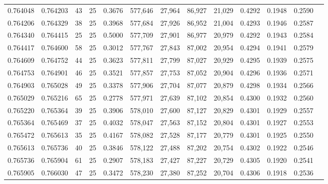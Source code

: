 \begin{tabular}{rrrrrrrrrrrrr}
0.764048 & 0.764203 &    43 &  25 &                                     0.3676 & 577,646 &  27,964 &  86,927 &  21,029 & 0.4292 & 0.1948 & 0.2590 \\
0.764206 & 0.764329 &    38 &  25 &                                     0.3968 & 577,684 &  27,926 &  86,952 &  21,004 & 0.4293 & 0.1946 & 0.2587 \\
0.764340 & 0.764415 &    25 &  25 &                                     0.5000 & 577,709 &  27,901 &  86,977 &  20,979 & 0.4292 & 0.1943 & 0.2584 \\
0.764417 & 0.764600 &    58 &  25 &                                     0.3012 & 577,767 &  27,843 &  87,002 &  20,954 & 0.4294 & 0.1941 & 0.2579 \\
0.764609 & 0.764752 &    44 &  25 &                                     0.3623 & 577,811 &  27,799 &  87,027 &  20,929 & 0.4295 & 0.1939 & 0.2575 \\
0.764753 & 0.764901 &    46 &  25 &                                     0.3521 & 577,857 &  27,753 &  87,052 &  20,904 & 0.4296 & 0.1936 & 0.2571 \\
0.764903 & 0.765028 &    49 &  25 &                                     0.3378 & 577,906 &  27,704 &  87,077 &  20,879 & 0.4298 & 0.1934 & 0.2566 \\
0.765029 & 0.765216 &    65 &  25 &                                     0.2778 & 577,971 &  27,639 &  87,102 &  20,854 & 0.4300 & 0.1932 & 0.2560 \\
0.765220 & 0.765364 &    39 &  25 &                                     0.3906 & 578,010 &  27,600 &  87,127 &  20,829 & 0.4301 & 0.1929 & 0.2557 \\
0.765364 & 0.765469 &    37 &  25 &                                     0.4032 & 578,047 &  27,563 &  87,152 &  20,804 & 0.4301 & 0.1927 & 0.2553 \\
0.765472 & 0.765613 &    35 &  25 &                                     0.4167 & 578,082 &  27,528 &  87,177 &  20,779 & 0.4301 & 0.1925 & 0.2550 \\
0.765613 & 0.765736 &    40 &  25 &                                     0.3846 & 578,122 &  27,488 &  87,202 &  20,754 & 0.4302 & 0.1922 & 0.2546 \\
0.765736 & 0.765904 &    61 &  25 &                                     0.2907 & 578,183 &  27,427 &  87,227 &  20,729 & 0.4305 & 0.1920 & 0.2541 \\
0.765905 & 0.766030 &    47 &  25 &                                     0.3472 & 578,230 &  27,380 &  87,252 &  20,704 & 0.4306 & 0.1918 & 0.2536 \\

\end{tabular}
